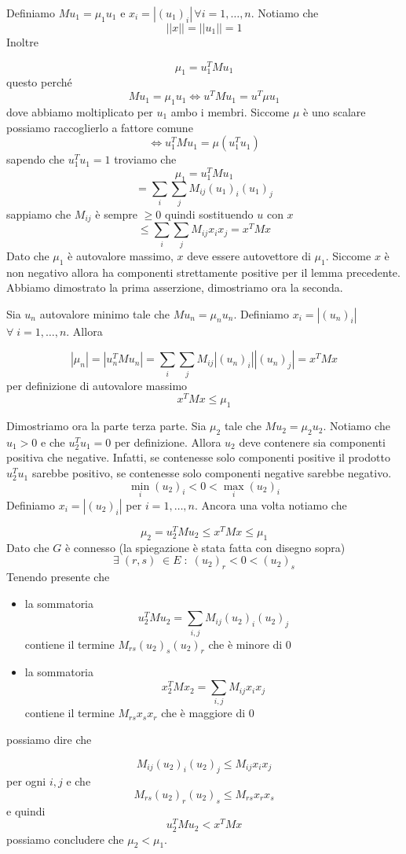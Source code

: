 \documentclass[12pt]{report}
\begin{document}
\begin{dimo} Definiamo $Mu_1 = \mu_1 u_1$ e $x_i = |(u_1)_i| \, \forall i = 1, \dots,n$. Notiamo che $$||x|| = ||u_1|| = 1$$ Inoltre

$$\mu_1 = u_1^T M u_1$$ 
questo perché 
$$Mu_1 = \mu_1 u_1 \Leftrightarrow u^T M u_1 = u^T \mu u_1$$
dove abbiamo moltiplicato per $u_1$ ambo i membri. Siccome $\mu$ è uno scalare possiamo raccoglierlo a fattore comune
$$\Leftrightarrow u_1^T M u_1 = \mu (u_1^T u_1)$$
sapendo che $u_1^T u_1 = 1$ troviamo che
$$\mu_1 = u_1^T M u_1$$ 
$$= \sum_i \sum_j M_{ij} (u_1)_i (u_1)_j$$
sappiamo che $M_{ij}$ è sempre $\geq 0$ quindi sostituendo $u$ con $x$ 
$$\leq \sum_i \sum_j M_{ij} x_i x_j = x^T M x$$
Dato che $\mu_1$ è autovalore massimo, $x$ deve essere autovettore di $\mu_1$. Siccome $x$ è non negativo allora ha componenti strettamente positive per il lemma precedente. Abbiamo dimostrato la prima asserzione, dimostriamo ora la seconda.

\noindent 
Sia $u_n$ autovalore minimo tale che $M u_n = \mu_n u_n$. Definiamo $x_i = |(u_n)_i| \;$ $ \forall \; i = 1, \dots,n$. Allora

$$|\mu_n| = |u_n^T M u_n| = \sum_i \sum_j M_{ij} |(u_n)_i| |(u_n)_j| = x^T M x$$
per definizione di autovalore massimo
$$x^T M x \leq \mu_1$$

\noindent 
Dimostriamo ora la parte terza parte.
Sia $\mu_2$ tale che $Mu_2 = \mu_2 u_2$. Notiamo che $u_1 > 0$ e che $u_2^T u_1 = 0$ per definizione.  Allora $u_2$ deve contenere sia componenti positiva che negative. Infatti, se contenesse solo componenti positive il prodotto $u_2^T u_1$ sarebbe positivo, se contenesse solo componenti negative sarebbe negativo.
$$\min_i (u_2)_i < 0 < \max_i (u_2)_i$$
Definiamo $x_i = |(u_2)_i|$ per $i = 1,\dots,n$. Ancora una volta notiamo che 

$$\mu_2 = u_2^T M u_2 \leq x^T M x \leq \mu_1$$
Dato che $G$ è connesso (la spiegazione è stata fatta con disegno sopra)
$$\exists \; (r,s) \; \in E\; : \; (u_2)_r < 0 < (u_2)_s$$
Tenendo presente che

\begin{itemize}
    \item la sommatoria $$u_2^T M u_2 = \sum_{i,j} M_{ij} (u_2)_i (u_2)_j$$  contiene il termine $M_{rs} (u_2)_s (u_2)_r$ che è minore di $0$
    \item la sommatoria $$x_2^T M x_2 = \sum_{i,j} M_{ij} x_i x_j$$  contiene il termine $M_{rs} x_s x_r$ che è maggiore di $0$
\end{itemize}
possiamo dire che 

$$M_{ij} (u_2)_i (u_2)_j \leq M_{ij} x_i x_j$$
per ogni $i,j$ e che
$$M_{rs} (u_2)_r (u_2)_s \leq M_{rs} x_r x_s$$
e quindi
$$u_2^T M u_2 < x^T M x$$
possiamo concludere che $\mu_2 < \mu_1$.
\end{dimo}
\end{document}
